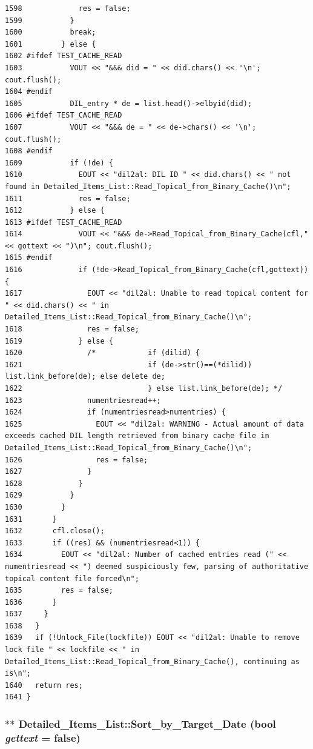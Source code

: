 \begin{verbatim}
1598             res = false;
1599           }
1600           break;
1601         } else {
1602 #ifdef TEST_CACHE_READ
1603           VOUT << "&&& did = " << did.chars() << '\n'; cout.flush();
1604 #endif
1605           DIL_entry * de = list.head()->elbyid(did);
1606 #ifdef TEST_CACHE_READ
1607           VOUT << "&&& de = " << de->chars() << '\n'; cout.flush();
1608 #endif
1609           if (!de) {
1610             EOUT << "dil2al: DIL ID " << did.chars() << " not found in Detailed_Items_List::Read_Topical_from_Binary_Cache()\n";
1611             res = false;
1612           } else {
1613 #ifdef TEST_CACHE_READ
1614             VOUT << "&&& de->Read_Topical_from_Binary_Cache(cfl," << gottext << ")\n"; cout.flush();
1615 #endif
1616             if (!de->Read_Topical_from_Binary_Cache(cfl,gottext)) { 
1617               EOUT << "dil2al: Unable to read topical content for " << did.chars() << " in Detailed_Items_List::Read_Topical_from_Binary_Cache()\n";
1618               res = false;
1619             } else {
1620               /*            if (dilid) {
1621                             if (de->str()==(*dilid)) list.link_before(de); else delete de;
1622                             } else list.link_before(de); */
1623               numentriesread++;
1624               if (numentriesread>numentries) {
1625                 EOUT << "dil2al: WARNING - Actual amount of data exceeds cached DIL length retrieved from binary cache file in Detailed_Items_List::Read_Topical_from_Binary_Cache()\n";
1626                 res = false;
1627               }
1628             }
1629           }
1630         }
1631       }
1632       cfl.close();
1633       if ((res) && (numentriesread<1)) {
1634         EOUT << "dil2al: Number of cached entries read (" << numentriesread << ") deemed suspiciously few, parsing of authoritative topical content file forced\n";
1635         res = false;
1636       }
1637     }
1638   }
1639   if (!Unlock_File(lockfile)) EOUT << "dil2al: Unable to remove lock file " << lockfile << " in Detailed_Items_List::Read_Topical_from_Binary_Cache(), continuing as is\n";
1640   return res;
1641 }
\end{verbatim}\normalsize 
{}
\subsubsection{ $\ast$$\ast$ Detailed\_\-Items\_\-List::Sort\_\-by\_\-Target\_\-Date (bool {\em gettext} = {\bf false})}\label{classDetailed__Items__List_a4}




